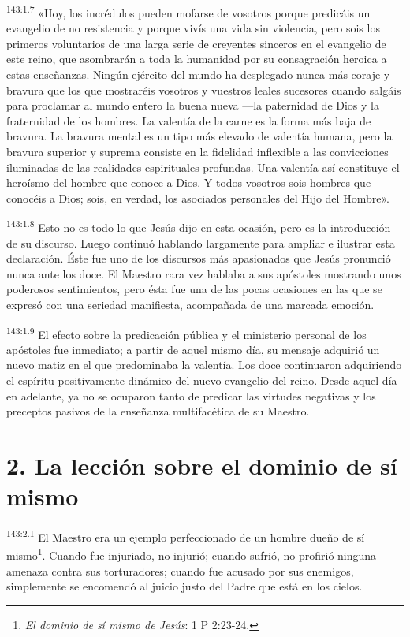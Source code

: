 \par 
\textsuperscript{143:1.7} «Hoy, los incrédulos pueden mofarse de vosotros porque predicáis un evangelio de no resistencia y porque vivís una vida sin violencia, pero sois los primeros voluntarios de una larga serie de creyentes sinceros en el evangelio de este reino, que asombrarán a toda la humanidad por su consagración heroica a estas enseñanzas. Ningún ejército del mundo ha desplegado nunca más coraje y bravura que los que mostraréis vosotros y vuestros leales sucesores cuando salgáis para proclamar al mundo entero la buena nueva ---la paternidad de Dios y la fraternidad de los hombres. La valentía de la carne es la forma más baja de bravura. La bravura mental es un tipo más elevado de valentía humana, pero la bravura superior y suprema consiste en la fidelidad inflexible a las convicciones iluminadas de las realidades espirituales profundas. Una valentía así constituye el heroísmo del hombre que conoce a Dios. Y todos vosotros sois hombres que conocéis a Dios; sois, en verdad, los asociados personales del Hijo del Hombre».

\par 
\textsuperscript{143:1.8} Esto no es todo lo que Jesús dijo en esta ocasión, pero es la introducción de su discurso. Luego continuó hablando largamente para ampliar e ilustrar esta declaración. Éste fue uno de los discursos más apasionados que Jesús pronunció nunca ante los doce. El Maestro rara vez hablaba a sus apóstoles mostrando unos poderosos sentimientos, pero ésta fue una de las pocas ocasiones en las que se expresó con una seriedad manifiesta, acompañada de una marcada emoción.

\par 
\textsuperscript{143:1.9} El efecto sobre la predicación pública y el ministerio personal de los apóstoles fue inmediato; a partir de aquel mismo día, su mensaje adquirió un nuevo matiz en el que predominaba la valentía. Los doce continuaron adquiriendo el espíritu positivamente dinámico del nuevo evangelio del reino. Desde aquel día en adelante, ya no se ocuparon tanto de predicar las virtudes negativas y los preceptos pasivos de la enseñanza multifacética de su Maestro.

\section*{2. La lección sobre el dominio de sí mismo}
\par 
\textsuperscript{143:2.1} El Maestro era un ejemplo perfeccionado de un hombre dueño de sí mismo\footnote{\textit{El dominio de sí mismo de Jesús}: 1 P 2:23-24.}. Cuando fue injuriado, no injurió; cuando sufrió, no profirió ninguna amenaza contra sus torturadores; cuando fue acusado por sus enemigos, simplemente se encomendó al juicio justo del Padre que está en los cielos.

